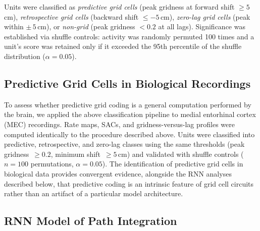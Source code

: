 \documentclass[11pt]{article}
\begin{document}
Units were classified as \textit{predictive grid cells} (peak gridness at forward shift $\ge 5$\,cm), \textit{retrospective grid cells} (backward shift $\le -5$\,cm), \textit{zero-lag grid cells} (peak within $\pm\,5$\,cm), or \textit{non-grid} (peak gridness $< 0.2$ at all lags). Significance was established via shuffle controls: activity was randomly permuted 100 times and a unit's score was retained only if it exceeded the 95th percentile of the shuffle distribution ($\alpha = 0.05$).


\subsection*{Predictive Grid Cells in Biological Recordings}

To assess whether predictive grid coding is a general computation performed by the brain, we applied the above classification pipeline to medial entorhinal cortex (MEC) recordings. Rate maps, SACs, and gridness-versus-lag profiles were computed identically to the procedure described above. Units were classified into predictive, retrospective, and zero-lag classes using the same thresholds (peak gridness~$\ge 0.2$, minimum shift~$\ge 5$\,cm) and validated with shuffle controls ($n = 100$ permutations, $\alpha = 0.05$). The identification of predictive grid cells in biological data provides convergent evidence, alongside the RNN analyses described below, that predictive coding is an intrinsic feature of grid cell circuits rather than an artifact of a particular model architecture.


\subsection*{RNN Model of Path Integration}
\end{document}
